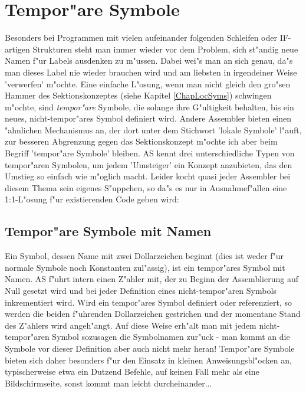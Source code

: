 \documentclass[12pt,a4paper,twoside]{report}
\newcommand{\asname}{AS}
\begin{document}

\section{Tempor"are Symbole}

Besonders bei Programmen mit vielen aufeinander folgenden Schleifen oder
IF-artigen Strukturen steht man immer wieder vor dem Problem, sich
st"andig neue Namen f"ur Labels ausdenken zu m"ussen.  Dabei wei"s man an
sich genau, da"s man dieses Label nie wieder brauchen wird und am liebsten
in irgendeiner Weise 'verwerfen' m"ochte.  Eine einfache L"osung, wenn man
nicht gleich den gro"sen Hammer des Sektionskonzeptes (siehe Kapitel
\ref{ChapLocSyms}) schwingen m"ochte, sind {\em tempor"are} Symbole, die
solange ihre G"ultigkeit behalten, bis ein neues, nicht-tempor"ares Symbol
definiert wird.  Andere Assembler bieten einen "ahnlichen Mechanismus an,
der dort unter dem Stichwort 'lokale Symbole' l"auft, zur besseren
Abgrenzung gegen das Sektionskonzept m"ochte ich aber beim Begriff
'tempor"are Symbole' bleiben.  \asname{} kennt drei unterschiedliche Typen von
tempor"aren Symbolen, um jedem 'Umsteiger' ein Konzept anzubieten, das den
Umstieg so einfach wie m"oglich macht.  Leider kocht quasi jeder Assembler
bei diesem Thema sein eigenes S"uppchen, so da"s es nur in Ausnahmef"allen
eine 1:1-L"osung f"ur existierenden Code geben wird:

\subsection{Tempor"are Symbole mit Namen}

Ein Symbol, dessen Name mit zwei Dollarzeichen beginnt (dies ist weder
f"ur normale Symbole noch Konstanten zul"assig), ist ein tempor"ares
Symbol mit Namen.  \asname{} f"uhrt intern einen Z"ahler mit, der zu Beginn der
Assemblierung auf Null gesetzt wird und bei jeder Definition eines
nicht-tempor"aren Symbols inkrementiert wird.  Wird ein tempor"ares Symbol
definiert oder referenziert, so werden die beiden f"uhrenden Dollarzeichen
gestrichen und der momentane Stand des Z"ahlers wird angeh"angt.  Auf
diese Weise erh"alt man mit jedem nicht-tempor"aren Symbol sozusagen die
Symbolnamen zur"uck - man kommt an die Symbole vor dieser Definition aber
auch nicht mehr heran!  Tempor"are Symbole bieten sich daher besonders
f"ur den Einsatz in kleinen Anweisungsbl"ocken an, typischerweise etwa ein
Dutzend Befehle, auf keinen Fall mehr als eine Bildschirmseite, sonst
kommt man leicht durcheinander...
\end{document}
